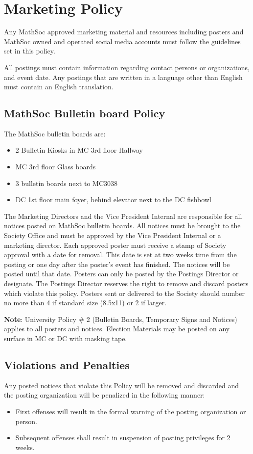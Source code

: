 \section{Marketing Policy}

Any MathSoc approved marketing material and resources including posters and MathSoc owned and operated social media accounts must follow the guidelines set in this policy. 

All postings must contain information regarding contact persons or organizations, and event date.
Any postings that are written in a language other than English must contain an English translation. 

\subsection{MathSoc Bulletin board Policy}

The MathSoc bulletin boards are: 
\begin{itemize}
    \item 2 Bulletin Kiosks in MC 3rd floor Hallway 
    \item MC 3rd floor Glass boards 
    \item 3 bulletin boards next to MC3038 
    \item DC 1st floor main foyer, behind elevator next to the DC fishbowl 
\end{itemize}

The Marketing Directors and the Vice President Internal are responsible for all notices posted on  MathSoc bulletin boards. 
All notices must be brought to the Society Office and must be approved by the  Vice President Internal or a marketing director. 
Each approved poster must receive a stamp of Society  approval with a date for removal. 
This date is set at two weeks time from the posting or one day after the  poster's event has finished. 
The notices will be posted until that date. 
Posters can only be posted by the  Postings Director or designate. 
The Postings Director reserves the right to remove and discard posters  which violate this policy. 
Posters sent or delivered to the Society should number no more than 4 if  standard size (8.5x11) or 2 if larger. 

\textbf{Note}: University Policy \# 2 (Bulletin Boards, Temporary Signs and Notices) applies to all posters and  notices. Election Materials may be posted on any surface in MC or DC with masking tape. 

\subsection{Violations and Penalties}

Any posted notices that violate this Policy will be removed and discarded and the posting organization  will be penalized in the following manner: 
\begin{itemize}
    \item First offenses will result in the formal warning of the posting organization or person.
    \item Subsequent offenses shall result in suspension of posting privileges for 2 weeks.
\end{itemize}